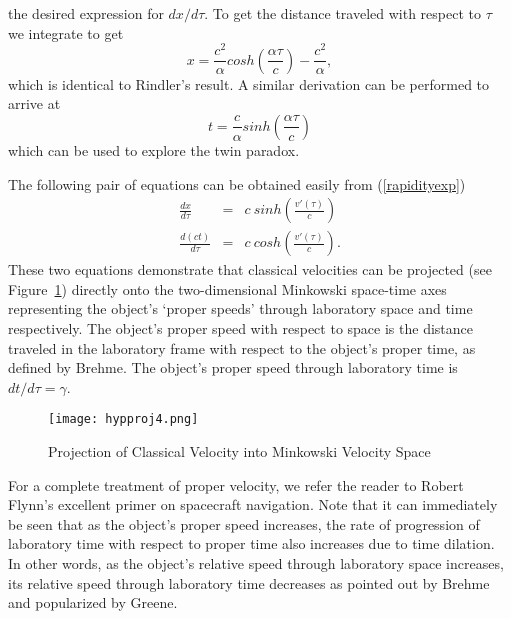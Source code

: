 \documentclass[prb,preprint]{revtex4-1}
\begin{document}
the desired expression for $dx/d\tau$.  To get the distance traveled with respect to $\tau$ we integrate to get
\begin{equation}
x=\frac{c^2}{\alpha}cosh\left(\frac{\alpha\tau}{c}\right)-\frac{c^2}{\alpha},
\end{equation}
which is identical to Rindler's result\cite{rinlderi}.  A similar derivation can be performed to arrive at
\begin{equation}
t =\frac{c}{\alpha}sinh\left(\frac{\alpha\tau}{c}\right)
\end{equation}
which can be used to explore the twin paradox.

The following pair of equations can be obtained easily from (\ref{rapidityexp}) 
\begin{eqnarray}
\frac{dx}{d\tau} & = & c\ sinh\left(\frac{v'\left(\tau\right)}{c}\right) \nonumber \\
\frac{d\left(ct\right)}{d\tau} & = & c\ cosh\left(\frac{v'\left(\tau\right)}{c}\right).
\end{eqnarray}
These two equations demonstrate that classical velocities can be projected (see Figure~\ref{sunsets}) directly onto the two-dimensional Minkowski space-time axes representing the object's ‘proper speeds’ through laboratory space and time respectively.  The object's proper speed with respect to space is the distance traveled in the laboratory frame with respect to the object's proper time, as defined by Brehme\cite{brehmefour}.  The object's proper speed through laboratory time is $dt/d\tau=\gamma$.

\begin{figure}[h!]
\centering
\texttt{[image: hypproj4.png]}
\caption{Projection of Classical Velocity into Minkowski Velocity Space}
\label{sunsets}
\end{figure}

For a complete treatment of proper velocity, we refer the reader to Robert Flynn's excellent primer on spacecraft navigation\cite{flynn}.  Note that it can immediately be seen that as the object's proper speed increases, the rate of progression of laboratory time with respect to proper time also increases due to time dilation.  In other words, as the object's relative speed through laboratory space increases, its relative speed through laboratory time decreases as pointed out by Brehme\cite{brehmegeo} and popularized by Greene\cite{greene}.
\end{document}
